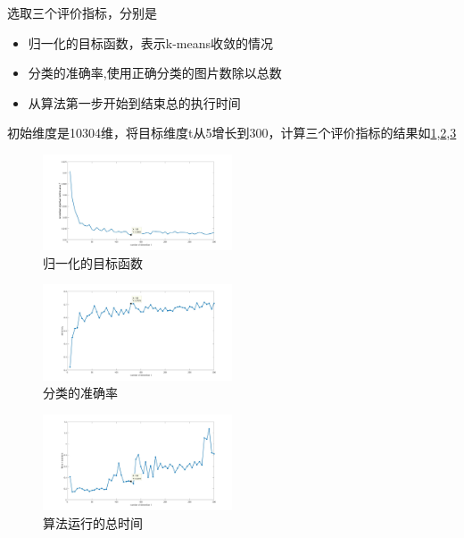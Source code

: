 \documentclass{ctexart}
\begin{document}
    选取三个评价指标，分别是
    \begin{itemize}
    \item 归一化的目标函数，表示k-means收敛的情况
    \item 分类的准确率,使用正确分类的图片数除以总数
    \item 从算法第一步开始到结束总的执行时间
    \end{itemize}
    初始维度是10304维，将目标维度t从5增长到300，计算三个评价指标的结果如\ref{1},\ref{2},\ref{3} \\

        \begin{figure}[h]
        \centering
        \includegraphics[width=0.50\textwidth]{result/norm_F.jpg}
        \caption{归一化的目标函数}
        \label{1}
        \end{figure}

        \begin{figure}[h]
        \centering
        \includegraphics[width=0.50\textwidth]{result/acc.jpg}
        \caption{分类的准确率}
        \label{2}
        \end{figure}

        \begin{figure}[h]
        \centering
        \includegraphics[width=0.50\textwidth]{result/time_RP.jpg}
        \caption{算法运行的总时间}
        \label{3}
        \end{figure}
\end{document}
